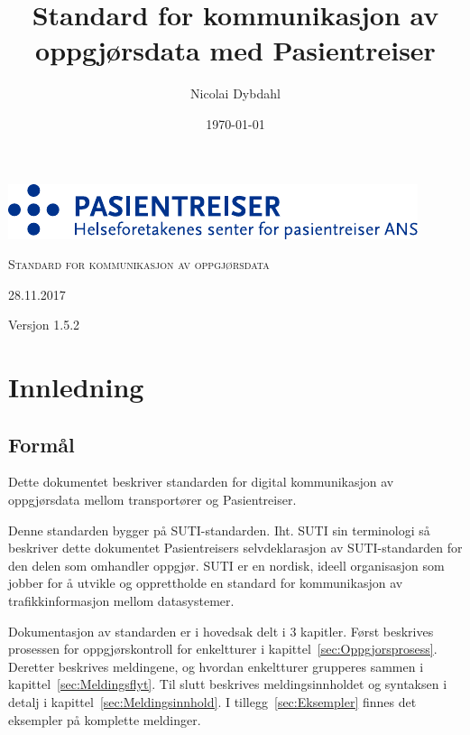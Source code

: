 \documentclass[a4paper,titlepage,norsk,11pt]{article}
\begin{document}

\title{Standard for kommunikasjon av oppgjørsdata med Pasientreiser}

\author{Nicolai Dybdahl}
\renewcommand{\dateseparator}{.}
\date{\ddmmyyyydate \today}

\begin{titlepage}
\vspace*{3cm}
{\centering

  \includegraphics[scale=1.2]{pasientreiser.pdf} \\
  \vspace{5.5cm}
  {\scshape\huge Standard for kommunikasjon av oppgjørsdata\par}
  \vspace{2cm}
  {\large 28.11.2017\par}
  \vspace{1.5cm}
  {\large Versjon 1.5.2\par}

}

\end{titlepage}

\newpage

\setcounter{tocdepth}{2}

\newpage
\tableofcontents

\newpage
{}

\section{Innledning}

\subsection{Formål}
Dette dokumentet beskriver standarden for digital kommunikasjon av oppgjørsdata mellom transportører og Pasientreiser.

Denne standarden bygger på SUTI-standarden. Iht. SUTI sin terminologi så beskriver dette dokumentet Pasientreisers selvdeklarasjon av SUTI-standarden for den delen som omhandler oppgjør. SUTI  er en nordisk, ideell organisasjon som jobber for å utvikle og opprettholde en standard for kommunikasjon av trafikkinformasjon mellom datasystemer.

Dokumentasjon av standarden er i hovedsak delt i 3 kapitler. Først beskrives prosessen for oppgjørskontroll for enkeltturer i kapittel~\ref{sec:Oppgjorsprosess}. Deretter beskrives meldingene, og hvordan enkeltturer grupperes sammen i kapittel~\ref{sec:Meldingsflyt}. Til slutt beskrives meldingsinnholdet og syntaksen i detalj i kapittel~\ref{sec:Meldingsinnhold}. I tillegg~\ref{sec:Eksempler} finnes det eksempler på komplette meldinger.
\end{document}
